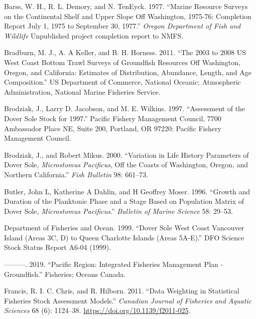 \documentclass[11pt,
  english,
  a4paper,
]{article}
\begin{document}
\hypertarget{refs}{}
\begin{cslreferences}
\leavevmode\hypertarget{ref-barss_marine_1977}{}%
Barss, W. H., R. L. Demory, and N. TenEyck. 1977. ``Marine Resource Surveys on the Continental Shelf and Upper Slope Off Washington, 1975-76: Completion Report July 1, 1975 to September 30, 1977.'' \emph{Oregon Department of Fish and Wildlife} Unpublished project completion report to NMFS.

\leavevmode\hypertarget{ref-bradburn_2003_2011}{}%
Bradburn, M. J., A. A Keller, and B. H. Horness. 2011. ``The 2003 to 2008 US West Coast Bottom Trawl Surveys of Groundfish Resources Off Washington, Oregon, and California: Estimates of Distribution, Abundance, Length, and Age Composition.'' US Department of Commerce, National Oceanic; Atmospheric Administration, National Marine Fisheries Service.

\leavevmode\hypertarget{ref-brodziak_assessment_1997}{}%
Brodziak, J., Larry D. Jacobson, and M. E. Wilkins. 1997. ``Assessment of the Dover Sole Stock for 1997.'' Pacific Fishery Management Council, 7700 Ambassador Place NE, Suite 200, Portland, OR 97220: Pacific Fishery Management Council.

\leavevmode\hypertarget{ref-brodziak_variation_2000}{}%
Brodziak, J., and Robert Mikus. 2000. ``Variation in Life History Parameters of Dover Sole, \emph{Microstomus Pacificus}, Off the Coasts of Washington, Oregon, and Northern California.'' \emph{Fish Bulletin} 98: 661--73.

\leavevmode\hypertarget{ref-butler_growth_1996}{}%
Butler, John L, Katherine A Dahlin, and H Geoffrey Moser. 1996. ``Growth and Duration of the Planktonic Phase and a Stage Based on Population Matrix of Dover Sole, \emph{Microstomus Pacificus}.'' \emph{Bulletin of Marine Science} 58: 29--53.

\leavevmode\hypertarget{ref-department_of_fisheries_and_ocean_dover_1999}{}%
Department of Fisheries and Ocean. 1999. ``Dover Sole West Coast Vancouver Island (Areas 3C, D) to Queen Charlotte Islands (Areas 5A-E).'' DFO Science Stock Status Report A6-04 (1999).

\leavevmode\hypertarget{ref-department_of_fisheries_and_ocean_pacific_2019}{}%
---------. 2019. ``Pacific Region: Integrated Fisheries Management Plan - Groundfish.'' Fisheries; Oceans Canada.

\leavevmode\hypertarget{ref-francis_data_2011}{}%
Francis, R. I. C. Chris, and R. Hilborn. 2011. ``Data Weighting in Statistical Fisheries Stock Assessment Models.'' \emph{Canadian Journal of Fisheries and Aquatic Sciences} 68 (6): 1124--38. \url{https://doi.org/10.1139/f2011-025}.


\end{cslreferences}
\end{document}
